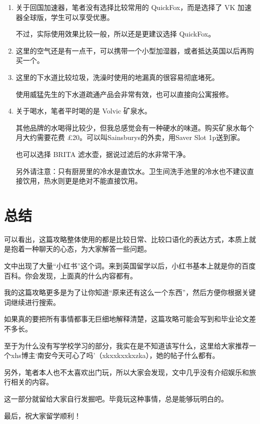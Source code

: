 \documentclass[UTF8,12pt,a4paper]{ctexart}
\begin{document}
\begin{enumerate}
    \item 关于回国加速器，笔者没有选择比较常用的 QuickFox，而是选择了 VK 加速器全球版，学生可以享受优惠。

    不过，实际使用效果比较一般，所以还是更建议选择 QuickFox。

    \item 这里的空气还是有一点干，可以携带一个小型加湿器，或者抵达英国以后再购买一个。

    \item 这里的下水道比较垃圾，洗澡时使用的地漏真的很容易彻底堵死。

    使用威猛先生的下水道疏通产品会非常有效，也可以直接向公寓报修。

    \item 关于喝水，笔者平时喝的是 Volvic 矿泉水。

    其他品牌的水喝得比较少，但我总感觉会有一种硬水的味道。购买矿泉水每个月大约需要花费 \pounds{}20。可以叫Sainsburys的外卖，用Saver Slot 1p送到家。

    也可以选择 BRITA 滤水壶，据说过滤后的水非常干净。

    另外请注意：只有厨房里的冷水是直饮水。卫生间洗手池里的冷水也不建议直接饮用，热水则更是绝对不能直接饮用。
\end{enumerate}

\section{总结}

可以看出，这篇攻略整体使用的都是比较日常、比较口语化的表达方式，本质上就是抱着一种聊天的心态，为大家解答一些问题。

文中出现了大量“小红书”这个词。来到英国留学以后，小红书基本上就是你的百度百科。你会发现，上面真的什么内容都有。

我的这篇攻略更多是为了让你知道“原来还有这么一个东西”，然后方便你根据关键词继续进行搜索。

如果真的要把所有事情都事无巨细地解释清楚，这篇攻略可能会写到和毕业论文差不多长。

至于为什么没有写学校学习的部分，我实在是不知道该写什么，这里给大家推荐一个xhs博主‘南安今天可心了吗’（xkxxkxxkxzka），她的帖子什么都有。

另外，笔者本人也不太喜欢出门玩，所以大家会发现，文中几乎没有介绍娱乐和旅行相关的内容。

这一部分就留给大家自行发掘吧。毕竟玩这种事情，总是能够玩明白的。

最后，祝大家留学顺利！

\end{document}
